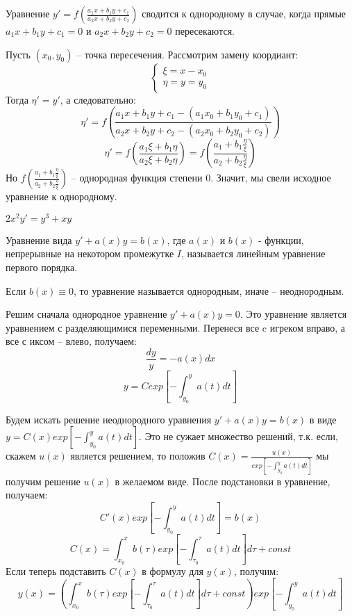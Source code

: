 \documentclass[document.tex]{subfiles}
\begin{document}
\begin{Statement}
Уравнение $y' = f(\frac{a_1x+b_1y+c_1}{a_2x+b_2y+c_2})$ сводится к однородному в случае, когда прямые $a_1x+b_1y+c_1 = 0$ и $a_2x+b_2y+c_2 = 0$ пересекаются.
\end{Statement}
\begin{Proof}
Пусть $(x_0, y_0)$ -- точка пересечения.
Рассмотрим замену коордиант:
$$\begin{cases}
\xi = x - x_0 \\
\eta = y = y_0
\end{cases}$$
Тогда $\eta' = y'$, а следовательно:
$$\eta' = f(\frac{a_1x+b_1y+c_1 - (a_1x_0 + b_1y_0 + c_1)}{a_2x+b_2y+c_2 - (a_2x_0 + b_2y_0 + c_2)})$$
$$\eta' = f(\frac{a_1\xi+b_1\eta}{a_2\xi+b_2\eta}) = f(\frac{a_1+b_1\frac{\eta}{\xi}}{a_2+b_2\frac{\eta}{\xi}})$$
Но $f(\frac{a_1+b_1\frac{\eta}{\xi}}{a_2+b_2\frac{\eta}{\xi}})$ -- однородная функция степени 0. Значит, мы свели исходное уравнение к однородному.
\end{Proof}
\begin{Example}
$2x^2y' = y^3 + xy$
\end{Example}
\begin{Definition}
Уравнение вида $y' + a(x)y = b(x)$, где $a(x)$ и $b(x)$ - функции, непрерывные на некотором промежутке $I$, называется линейным уравнение первого порядка.

Если $b(x) \equiv 0$, то уравнение называется однородным, иначе -- неоднородным.
\end{Definition}
\begin{Remark}
Решим сначала однородное уравнение $y' + a(x)y = 0$. Это уравнение является уравнением с разделяющимися переменными. Перенеся все c игреком вправо, а все с иксом -- влево, получаем:
$$\frac{dy}{y} = -a(x)dx$$
$$y = Cexp\left[-\int^{y}_{y_0}a(t)dt\right]$$

Будем искать решение неоднородного уравнения $y' + a(x)y = b(x)$ в виде $y = C(x)exp\left[-\int^{y}_{y_0}a(t)dt\right]$. Это не сужает множество решений, т.к. если, скажем $u(x)$ является решением, то положив $C(x) = \frac{u(x)}{exp\left[-\int^{y}_{y_0}a(t)dt\right]}$ мы получим решение $u(x)$ в желаемом виде. После подстановки в уравнение, получаем:
$$C'(x)exp\left[-\int^{y}_{y_0}a(t)dt\right] = b(x)$$
$$C(x) = \int_{x_0}^{x}b(\tau)exp\left[-\int^{\tau}_{\tau_0}a(t)dt\right]d\tau + const$$
Если теперь подставить $C(x)$ в формулу для $y(x)$, получим:
$$y(x) = \left( \int_{x_0}^{x}b(\tau)exp\left[-\int^{\tau}_{\tau_0}a(t)dt\right]d\tau + const\right)exp\left[-\int^{y}_{y_0}a(t)dt\right]$$
\end{Remark}
\end{document}
